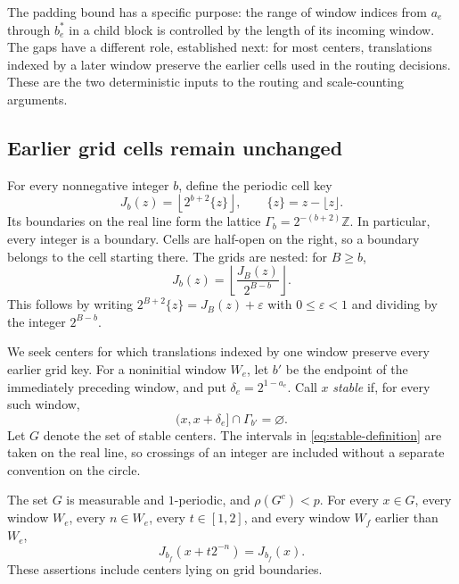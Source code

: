 The padding bound has a specific purpose: the range of window indices
from $a_e$ through $b_e^*$ in a child block is controlled by the length
of its incoming window. The gaps have a different role, established
next: for most centers, translations indexed by a later window preserve
the earlier cells used in the routing decisions. These
are the two deterministic inputs to the routing and scale-counting
arguments.



\subsection{Earlier grid cells remain unchanged}

For every nonnegative integer $b$, define the periodic cell key
\begin{equation}
 J_b(z)=\left\lfloor2^{b+2}\{z\}\right\rfloor,
 \qquad \{z\}=z-\lfloor z\rfloor.
 \label{eq:grid-key}
\end{equation}
Its boundaries on the real line form the lattice
$\Gamma_b=2^{-(b+2)}\mathbb Z$.  In particular, every integer is a
boundary.  Cells are half-open on the right, so a boundary belongs to
the cell starting there.  The grids are nested: for $B\ge b$,
\begin{equation}
 J_b(z)=\left\lfloor\frac{J_B(z)}{2^{B-b}}\right\rfloor.
 \label{eq:grid-nesting}
\end{equation}
This follows by writing $2^{B+2}\{z\}=J_B(z)+\varepsilon$ with
$0\le\varepsilon<1$ and dividing by the integer $2^{B-b}$.

We seek centers for which translations indexed by one window preserve
every earlier grid key.  For a noninitial window $W_e$, let $b'$ be the
endpoint of the immediately preceding window, and put
$\delta_e=2^{1-a_e}$.  Call $x$ \emph{stable} if, for every such window,
\begin{equation}
 (x,x+\delta_e]\cap\Gamma_{b'}=\varnothing.
 \label{eq:stable-definition}
\end{equation}
Let $G$ denote the set of stable centers.  The intervals in
\eqref{eq:stable-definition} are taken on the real line, so crossings
of an integer are included without a separate convention on the circle.

\begin{lemma}\label{lem:stable}
The set $G$ is measurable and $1$-periodic, and $\rho(G^c)<p$.
For every $x\in G$, every window $W_e$, every $n\in W_e$, every
$t\in[1,2]$, and every window $W_f$ earlier than $W_e$,
\begin{equation}
 J_{b_f}(x+t2^{-n})=J_{b_f}(x).
 \label{eq:stable-keys}
\end{equation}
These assertions include centers lying on grid boundaries.
\end{lemma}

